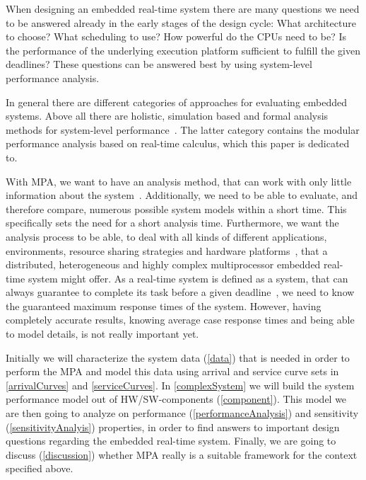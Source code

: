 \label{introduction}

When designing an embedded real-time system there are many questions we need to be answered already in the early stages of the design cycle: 
What architecture to choose? What scheduling to use? How powerful do the CPUs need to be? Is the performance of the underlying execution platform sufficient to fulfill the given deadlines?
These questions can be answered best by using system-level performance analysis.

In general there are different categories of approaches for evaluating embedded systems.
Above all there are holistic, simulation based and formal analysis methods for system-level performance~\cite{wan:06}.
The latter category contains the modular performance analysis based on real-time calculus, which this paper is dedicated to.

With MPA, we want to have an analysis method, that can work with only little information about the system~\cite{wan:06}.
Additionally, we need to be able to evaluate, and therefore compare, numerous possible system models within a short time.
This specifically sets the need for a short analysis time.
Furthermore, we want the analysis process to be able, to deal with all kinds of different applications, environments, resource sharing strategies and hardware platforms~\cite{thi:07},
that a distributed, heterogeneous and highly complex multiprocessor embedded real-time system might offer.
As a real-time system is defined as a system, that can always guarantee to complete its task before a given deadline~\cite{mar}, we need to know the guaranteed maximum response times of the system.
However, having completely accurate results, knowing average case response times and being able to model details, is not really important yet.


Initially we will characterize the system data (\autoref{data}) that is needed in order to perform the MPA and model this data using arrival and service 
curve sets in \autoref{arrivalCurves} and \autoref{serviceCurves}. 
In \autoref{complexSystem} we will build the system performance model out of HW/SW-components (\autoref{component}).
This model we are then going to analyze on performance (\autoref{performanceAnalysis}) and sensitivity (\autoref{sensitivityAnalyis}) properties, in order to find answers to important design questions regarding the embedded real-time system.
Finally, we are going to discuss (\autoref{discussion}) whether MPA really is a suitable framework for the context specified above.

